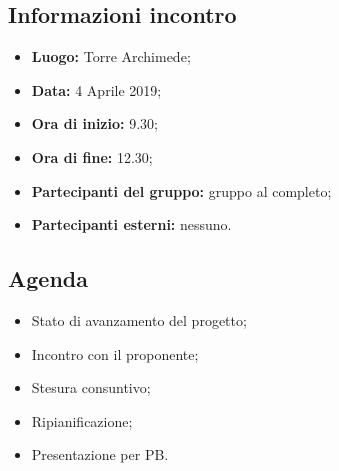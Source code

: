 \subsection{Informazioni incontro}
\begin{itemize}
	\item { \textbf{Luogo:} Torre Archimede};
	\item { \textbf{Data:} 4 Aprile 2019};
	\item { \textbf{Ora di inizio:} 9.30};
	\item { \textbf{Ora di fine:} 12.30};
	\item { \textbf{Partecipanti del gruppo:} gruppo al completo};
	\item { \textbf{Partecipanti esterni:} nessuno}.
\end{itemize}


\subsection{Agenda}
\begin{itemize}
	\item {Stato di avanzamento del progetto;}
	\item {Incontro con il proponente;}
	\item {Stesura consuntivo;}
	\item {Ripianificazione;}
	\item {Presentazione per PB.}
\end{itemize}

